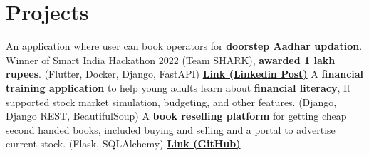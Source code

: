 \section{Projects}
  \resumeSubHeadingListStart
      {An application where user can book operators for \textbf{doorstep Aadhar updation}. Winner of Smart India Hackathon 2022 (Team SHARK), \textbf{awarded 1 lakh rupees}. (Flutter, Docker, Django, FastAPI) \href{https://www.linkedin.com/posts/hsk4link_sih-sih2022-smartindiahackathon-activity-6970324738409672704-YcQA/}{\textbf{Link (Linkedin Post)}}}
      {A \textbf{financial training application} to help young adults learn about \textbf{financial literacy}, It supported stock market simulation, budgeting, and other features. (Django, Django REST, BeautifulSoup)}
      {A \textbf{book reselling platform} for getting cheap second handed books, included buying and selling and a portal to advertise current stock. (Flask, SQLAlchemy) \href{https://github.com/hari01584/Pustika-Eclipse-Hackathon}{\textbf{Link (GitHub)}}}


  \resumeSubHeadingListEnd
